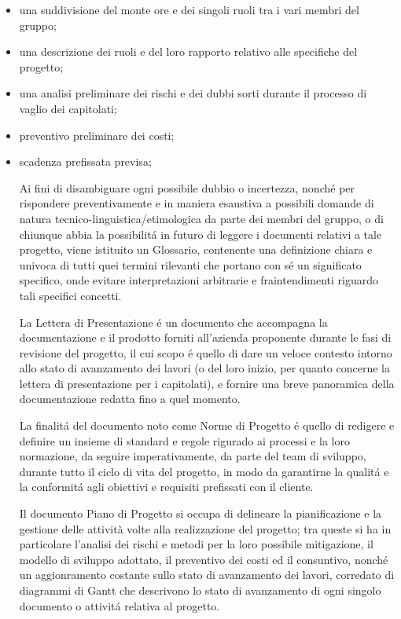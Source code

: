\begin{itemize}
\begin{itemize}
    \item una suddivisione del monte ore e dei singoli ruoli tra i vari membri del gruppo;
    \item una descrizione dei ruoli e del loro rapporto relativo alle specifiche del progetto;
    \item una analisi preliminare dei rischi e dei dubbi sorti durante il processo di vaglio dei capitolati;
    \item preventivo preliminare dei costi;
    \item scadenza prefissata previsa;

Ai fini di disambiguare ogni possibile dubbio o incertezza, nonché per rispondere preventivamente e in maniera esaustiva a possibili domande di natura tecnico-linguistica/etimologica da parte dei membri del gruppo, o di chiunque abbia la possibilitá in futuro di leggere i documenti relativi a tale progetto, viene istituito un Glossario, contenente una definizione chiara e univoca di tutti quei termini rilevanti che portano con sé un significato specifico, onde evitare interpretazioni arbitrarie e fraintendimenti riguardo tali specifici concetti.

La Lettera di Presentazione é un documento che accompagna la documentazione e il prodotto forniti all'azienda proponente durante le fasi di revisione del progetto, il cui scopo é quello di dare un veloce contesto intorno allo stato di avanzamento dei lavori (o del loro inizio, per quanto concerne la lettera di presentazione per i capitolati), e fornire una breve panoramica della documentazione redatta fino a quel momento. 

La finalitá del documento noto come Norme di Progetto é quello di redigere e definire un insieme di standard e regole rigurado ai processi e la loro normazione, da seguire imperativamente, da parte del team di sviluppo, durante tutto il ciclo di vita del progetto, in modo da garantirne la qualitá e la conformitá agli obiettivi e requisiti prefissati con il cliente.

Il documento Piano di Progetto si occupa di delineare la pianificazione e la gestione delle attività volte alla realizzazione del progetto; tra queste si ha in particolare l'analisi dei rischi e metodi per la loro possibile mitigazione, il modello di sviluppo adottato, il preventivo dei costi ed il consuntivo, nonché un aggionramento costante sullo stato di avanzamento dei lavori, corredato di diagrammi di Gantt che descrivono lo stato di avanzamento di ogni singolo documento o attivitá relativa al progetto.


\end{itemize}
\end{itemize}
